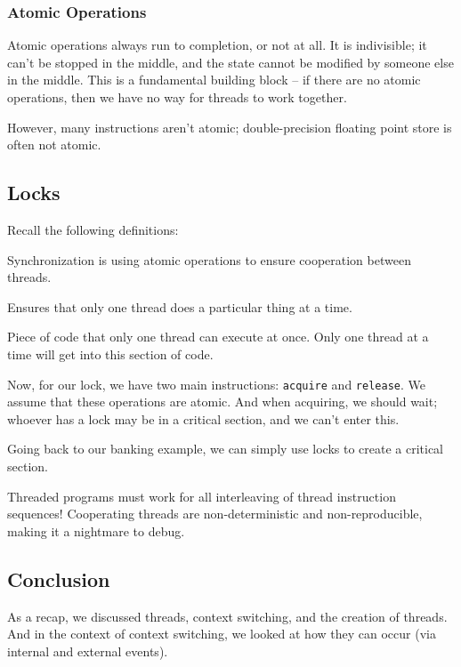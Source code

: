 \documentclass[openany]{book}
\begin{document}
\subsubsection{Atomic Operations}
Atomic operations always run to completion, or not at all. It is indivisible; it can't be stopped in the middle, and the state cannot be modified by someone else in the middle. This is a fundamental building block -- if there are no atomic operations, then we have no way for threads to work together.

However, many instructions aren't atomic; double-precision floating point store is often not atomic.

\subsection{Locks}
Recall the following definitions:

\begin{defn}[Synchronization]
	Synchronization is using atomic operations to ensure cooperation between threads.
\end{defn}

\begin{defn}
	Ensures that only one thread does a particular thing at a time.
\end{defn}

\begin{defn}
	Piece of code that only one thread can execute at once. Only one thread at a time will get into this section of code.
\end{defn}

Now, for our lock, we have two main instructions: \texttt{acquire} and \texttt{release}. We assume that these operations are atomic. And when acquiring, we should wait; whoever has a lock may be in a critical section, and we can't enter this.

Going back to our banking example, we can simply use locks to create a critical section.

\begin{warn}
	Threaded programs must work for all interleaving of thread instruction sequences! Cooperating threads are non-deterministic and non-reproducible, making it a nightmare to debug.
\end{warn}

\subsection{Conclusion}
As a recap, we discussed threads, context switching, and the creation of threads. And in the context of context switching, we looked at how they can occur (via internal and external events).
\end{document}
